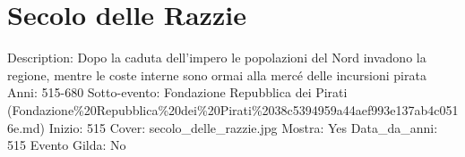 \section{Secolo delle Razzie}\label{secolo-delle-razzie}

Description: Dopo la caduta dell'impero le popolazioni del Nord invadono
la regione, mentre le coste interne sono ormai alla mercé delle
incursioni pirata Anni: 515-680 Sotto-evento: Fondazione Repubblica dei
Pirati
(Fondazione\%20Repubblica\%20dei\%20Pirati\%2038c5394959a44aef993e137ab4c0516e.md)
Inizio: 515 Cover: secolo\_delle\_razzie.jpg Mostra: Yes Data\_da\_anni:
515 Evento Gilda: No
